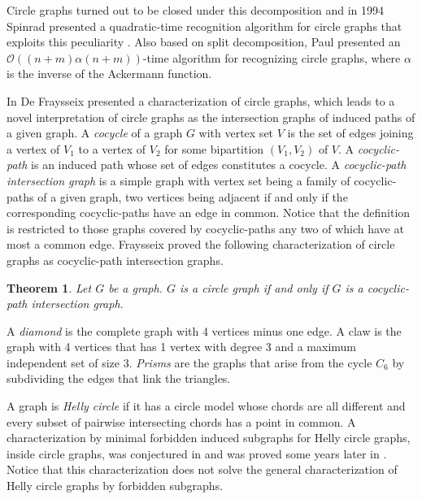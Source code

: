 \documentclass[12pt]{book}
\theoremstyle{plain}
\newtheorem{teo}{Theorem}[chapter]
\theoremstyle{remark}
\begin{document}
Circle graphs turned out to be closed under this decomposition \cite{B87} and in 1994 Spinrad presented a quadratic-time recognition algorithm for circle graphs that exploits this peculiarity \cite{S94}. Also based on split decomposition, Paul \cite{P06} presented an $\mathcal{O}((n + m)\alpha(n + m))$-time algorithm for recognizing circle graphs, where $\alpha$ is the inverse of the Ackermann function.


In \cite{F84} De Fraysseix presented a characterization of circle graphs, which leads to a novel in\-ter\-pre\-ta\-tion of circle graphs as the intersection graphs of induced paths of a given graph. A \emph{cocycle }of a graph $G$ with vertex set $V$ is the set of edges joining a vertex of $V_1$ to a vertex of $V_2$ for some bipartition $(V_1,V_2)$ of $V$. A \emph{cocyclic-path }is an induced path whose set of edges constitutes a cocycle. A \emph{cocyclic-path intersection graph } is a simple graph with vertex set being a family of cocyclic-paths of a given graph, two vertices being adjacent if and only if the corresponding cocyclic-paths have an edge in common. Notice that the definition is restricted to those graphs covered by cocyclic-paths any two of which have at most a common edge. Fraysseix proved the following characterization of circle graphs as cocyclic-path intersection graphs.

\begin{teo}\cite{F84} 
Let $G$ be a graph. $G$ is a circle graph if and only if $G$ is a cocyclic-path intersection graph.
\end{teo}

A \emph{diamond} is the complete graph with 4 vertices minus one edge. 
A claw is the graph with 4 vertices that has 1 vertex with degree 3 and a 
maximum independent set of size 3.
\emph{Prisms} are the graphs that arise from the cycle $C_6$ by subdividing the edges that link the triangles.

A graph is \emph{Helly circle }if it has a circle model whose chords
are all different and every subset of pairwise intersecting chords has a point in common. 
A characterization by minimal forbidden induced subgraphs for Helly circle graphs, inside circle graphs,
was conjectured in \cite{D03} and was proved some years later in \cite{DGR10}. Notice that this characterization does not solve the general characterization of Helly circle graphs by forbidden subgraphs.


\end{document}
